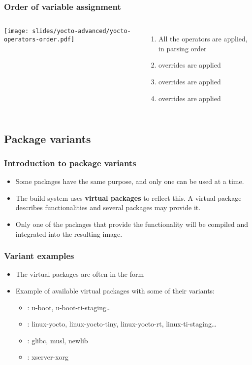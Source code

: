 \begin{frame}
  \frametitle{Order of variable assignment}
  \begin{columns}
      \texttt{[image: slides/yocto-advanced/yocto-operators-order.pdf]}
      \begin{enumerate}
        \item All the operators are applied, in parsing order
        \item {} overrides are applied
        \item {} overrides are applied
        \item {} overrides are applied
      \end{enumerate}
  \end{columns}
\end{frame}

\subsection{Package variants}

\begin{frame}
  \frametitle{Introduction to package variants}
  \begin{itemize}
    \item Some packages have the same purpose, and only one can be
      used at a time.
    \item The build system uses {\bf virtual packages} to reflect
      this. A virtual package describes functionalities and several
      packages may provide it.
    \item Only one of the packages that provide the functionality will
    be compiled and integrated into the resulting image.
  \end{itemize}
\end{frame}

\begin{frame}
  \frametitle{Variant examples}
  \begin{itemize}
    \item The virtual packages are often in the form
    \item Example of available virtual packages with some of their
      variants:
      \begin{itemize}
        \item {}: u-boot,
          u-boot-ti-staging\dots
        \item {}: linux-yocto, linux-yocto-tiny,
          linux-yocto-rt, linux-ti-staging\dots
        \item {}: glibc, musl, newlib
        \item {}: xserver-xorg
      \end{itemize}
  \end{itemize}
\end{frame}


